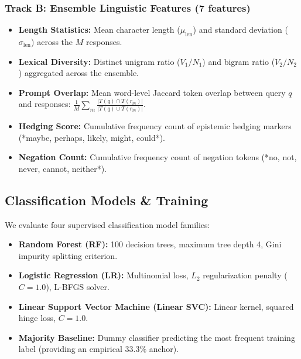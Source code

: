 \documentclass[conference]{IEEEtran}
\begin{document}
\subsubsection{Track B: Ensemble Linguistic Features (7 features)}
\begin{itemize}
    \item \textbf{Length Statistics:} Mean character length ($\mu_{\text{len}}$) and standard deviation ($\sigma_{\text{len}}$) across the $M$ responses.
    \item \textbf{Lexical Diversity:} Distinct unigram ratio ($V_1 / N_1$) and bigram ratio ($V_2 / N_2$) aggregated across the ensemble.
    \item \textbf{Prompt Overlap:} Mean word-level Jaccard token overlap between query $q$ and responses: $\frac{1}{M} \sum_m \frac{|T(q) \cap T(r_m)|}{|T(q) \cup T(r_m)|}$.
    \item \textbf{Hedging Score:} Cumulative frequency count of epistemic hedging markers (*maybe, perhaps, likely, might, could*).
    \item \textbf{Negation Count:} Cumulative frequency count of negation tokens (*no, not, never, cannot, neither*).
\end{itemize}

\subsection{Classification Models & Training}
We evaluate four supervised classification model families:
\begin{itemize}
    \item \textbf{Random Forest (RF):} 100 decision trees, maximum tree depth 4, Gini impurity splitting criterion.
    \item \textbf{Logistic Regression (LR):} Multinomial loss, $L_2$ regularization penalty ($C=1.0$), L-BFGS solver.
    \item \textbf{Linear Support Vector Machine (Linear SVC):} Linear kernel, squared hinge loss, $C=1.0$.
    \item \textbf{Majority Baseline:} Dummy classifier predicting the most frequent training label (providing an empirical $33.3\%$ anchor).
\end{itemize}
\end{document}
